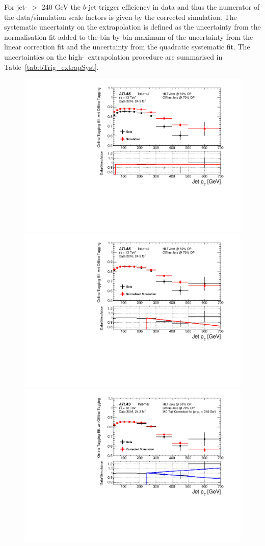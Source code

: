 For jet-\pT{} $>$ 240 GeV the $b$-jet trigger efficiency in data and thus the numerator of the data/simulation scale factors is given by the corrected simulation.
The systematic uncertainty on the extrapolation is defined as the uncertainty from the normalisation fit
added to the bin-by-bin maximum of the uncertainty from the linear correction fit and the uncertainty from the quadratic systematic fit.
The uncertainties on the high-\pT~extrapolation procedure  are summarised in Table~\ref{tab:bTrig_extrapSyst}.

\begin{figure}[!ht]
\begin{center}
\captionsetup[subfigure]{aboveskip=0pt,justification=centering}
   {\includegraphics[width=0.47\linewidth, angle=0]{figs/Trigger/Full_GRL_bslt2mm_effFit_jetPt.pdf} }
   {\includegraphics[width=0.47\linewidth, angle=0]{figs/Trigger/Full_GRL_bslt2mm_effNormFit_jetPt.pdf}} \\
   {\includegraphics[width=0.47\linewidth, angle=0]{figs/Trigger/Full_GRL_bslt2mm_effCorrShapeErr_jetPt.pdf}}

\end{center}
\end{figure}
